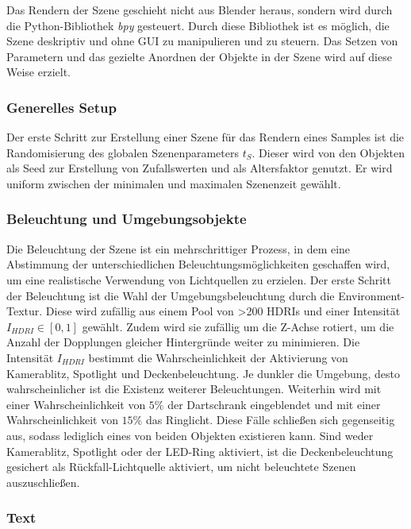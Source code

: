 Das Rendern der Szene geschieht nicht aus Blender heraus, sondern wird durch die Python-Bibliothek \textit{bpy} gesteuert. Durch diese Bibliothek ist es möglich, die Szene deskriptiv und ohne GUI zu manipulieren und zu steuern. Das Setzen von Parametern und das gezielte Anordnen der Objekte in der Szene wird auf diese Weise erzielt.

\subsubsection{Generelles Setup}
\label{sec:impl:daten:python:setup}

Der erste Schritt zur Erstellung einer Szene für das Rendern eines Samples ist die Randomisierung des globalen Szenenparameters $t_S$. Dieser wird von den Objekten als Seed zur Erstellung von Zufallswerten und als Altersfaktor genutzt. Er wird uniform zwischen der minimalen und maximalen Szenenzeit gewählt.

\subsubsection{Beleuchtung und Umgebungsobjekte}
\label{sec:impl:daten:python:licht}

Die Beleuchtung der Szene ist ein mehrschrittiger Prozess, in dem eine Abstimmung der unterschiedlichen Beleuchtungsmöglichkeiten geschaffen wird, um eine realistische Verwendung von Lichtquellen zu erzielen. Der erste Schritt der Beleuchtung ist die Wahl der Umgebungsbeleuchtung durch die Environment-Textur. Diese wird zufällig aus einem Pool von >200 HDRIs und einer Intensität $I_{HDRI} \in [0, 1]$ gewählt. Zudem wird sie zufällig um die Z-Achse rotiert, um die Anzahl der Dopplungen gleicher Hintergründe weiter zu minimieren. Die Intensität $I_{HDRI}$ bestimmt die Wahrscheinlichkeit der Aktivierung von Kamerablitz, Spotlight und Deckenbeleuchtung. Je dunkler die Umgebung, desto wahrscheinlicher ist die Existenz weiterer Beleuchtungen.
Weiterhin wird mit einer Wahrscheinlichkeit von $5\%$ der Dartschrank eingeblendet und mit einer Wahrscheinlichkeit von $15\%$ das Ringlicht. Diese Fälle schließen sich gegenseitig aus, sodass lediglich eines von beiden Objekten existieren kann.
Sind weder Kamerablitz, Spotlight oder der LED-Ring aktiviert, ist die Deckenbeleuchtung gesichert als Rückfall-Lichtquelle aktiviert, um nicht beleuchtete Szenen auszuschließen.

\subsubsection{Text}
\label{sec:impl:daten:python:text}

